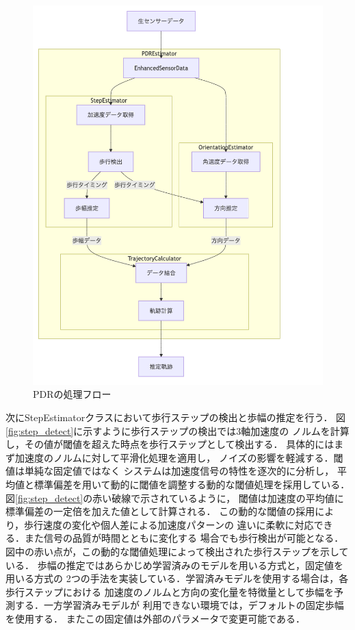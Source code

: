 \begin{figure}[H]
    \centering
    \includegraphics[width=\linewidth]{../image/pdr_flow2.png}
    \caption{PDRの処理フロー}
    \label{fig:pdr-flow}
\end{figure}


次にStepEstimatorクラスにおいて歩行ステップの検出と歩幅の推定を行う．
図\ref{fig:step_detect}に示すように歩行ステップの検出では3軸加速度の
ノルムを計算し，その値が閾値を超えた時点を歩行ステップとして検出する．
具体的にはまず加速度のノルムに対して平滑化処理を適用し，
ノイズの影響を軽減する．閾値は単純な固定値ではなく
システムは加速度信号の特性を逐次的に分析し，
平均値と標準偏差を用いて動的に閾値を調整する動的な閾値処理を採用している．
図\ref{fig:step_detect}の赤い破線で示されているように，
閾値は加速度の平均値に標準偏差の一定倍を加えた値として計算される．
この動的な閾値の採用により，歩行速度の変化や個人差による加速度パターンの
違いに柔軟に対応できる．また信号の品質が時間とともに変化する  %
場合でも歩行検出が可能となる．
図中の赤い点が，この動的な閾値処理によって検出された歩行ステップを示している．
歩幅の推定ではあらかじめ学習済みのモデルを用いる方式と，固定値を用いる方式の
2つの手法を実装している．学習済みモデルを使用する場合は，各歩行ステップにおける
加速度のノルムと方向の変化量を特徴量として歩幅を予測する．一方学習済みモデルが
利用できない環境では，デフォルトの固定歩幅を使用する．
またこの固定値は外部のパラメータで変更可能である．

